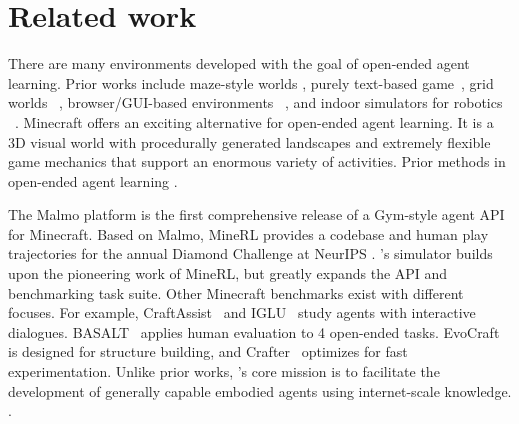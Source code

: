 \section{Related work}
\label{sec:related}
There are many environments developed with the goal of open-ended agent learning. Prior works include maze-style worlds \cite{team2021openended,wang2019paired, juliani2019obstacletower}, purely text-based game~\cite{heinrich2020nethack}, grid worlds ~\cite{boisvert2019babyai,cao2020babyai}, browser/GUI-based environments ~\cite{shi2017worldofbits,toyama2021androidenv}, and indoor simulators for robotics ~\cite{deepmind2020playroom,shen2020igibson,srivastava2021behavior,fan2021secant,shridhar2020alfred,savva2019habitat,puig2018virtualhome}. 
Minecraft offers an exciting alternative for open-ended agent learning. It is a 3D visual world with procedurally generated landscapes and extremely flexible game mechanics that support an enormous variety of activities.
Prior methods in open-ended agent learning .  

\vspace{-0.05in}
 The Malmo platform \cite{johnson16malmo} is the first comprehensive release of a Gym-style agent API \cite{brockman2016openai} for Minecraft. Based on Malmo, MineRL \cite{guss2019minerl} provides a codebase and human play trajectories for the annual Diamond Challenge at NeurIPS \cite{guss2019minerl2,guss2021minerl,kanervisto2022minerl}. \minedojo's simulator builds upon the pioneering work of MineRL, but greatly expands the API and benchmarking task suite. Other Minecraft benchmarks exist with different focuses. For example, CraftAssist~\cite{gray2019craftassist} and IGLU~\cite{kiseleva2021neurips} study agents with interactive dialogues.  BASALT~\cite{shah2021basalt} applies human evaluation to 4 open-ended tasks. EvoCraft~\cite{grbic21evocraft} is designed for structure building, and Crafter~\cite{hafner2021crafter} optimizes for fast experimentation. Unlike prior works, \minedojo's core mission is to facilitate the development of generally capable embodied agents using internet-scale knowledge. .

